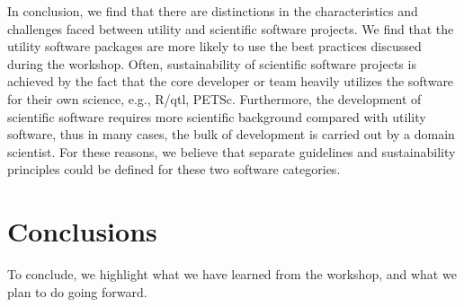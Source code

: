 \documentclass[11pt, oneside]{amsart}
\newcommand{\todo}[1]{{\color{blue}$\blacksquare$~\textsf{[TODO: #1]}}}
\newcommand{\note}[1]{ {\textcolor{red}    { #1 }}}
\newcommand{\toolname}[1] {\textsf{#1}}
\begin{document}
In conclusion, we find that there are distinctions in the
characteristics and challenges faced between utility and
scientific software projects.  
We %
find that the
utility software packages are more likely to use the best
practices discussed during the workshop. Often, sustainability of
scientific software projects is achieved by the fact that the core
developer or team heavily utilizes the software for their own science,
e.g., \toolname{R/qtl, PETSc}.  Furthermore, the development of
scientific software requires more scientific background compared with
utility software, thus in many cases, the bulk of development
is carried out by a domain scientist. For these reasons, we
believe that separate guidelines and sustainability principles could
be defined for these two software categories.



\section{Conclusions} \label{sec:conclusions}

To conclude, we highlight what we have learned from the workshop, and what we plan to do going forward.


\end{document}
